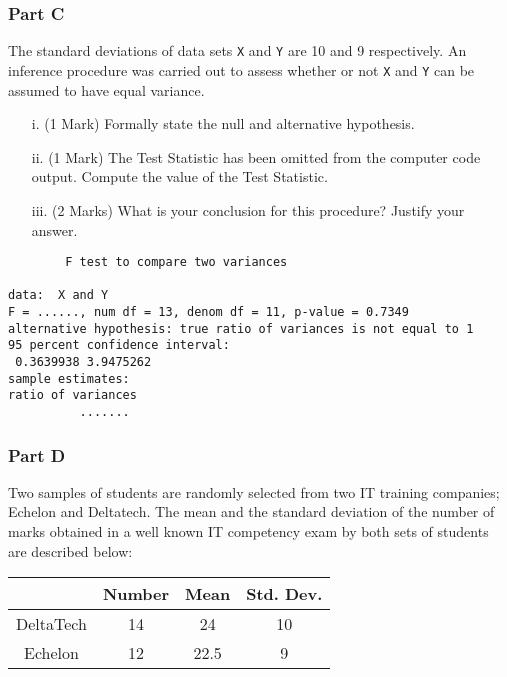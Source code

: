 \documentclass[a4paper,12pt]{article}
\begin{document}
\subsubsection*{Part C} %
The standard deviations of data sets \texttt{X} and \texttt{Y} are 10 and 9 respectively. An inference procedure was carried out to assess whether or not \texttt{X} and \texttt{Y} can be assumed to have equal variance.
\begin{itemize}
\item[i.](1 Mark) Formally state the null and alternative hypothesis.
\item[ii.](1 Mark) The Test Statistic has been omitted from the computer code output. Compute the value of the Test Statistic.
\item[iii.](2 Marks) What is your conclusion for this procedure? Justify your answer.
\end{itemize}

\begin{framed}
\begin{verbatim}
        F test to compare two variances

data:  X and Y
F = ......, num df = 13, denom df = 11, p-value = 0.7349
alternative hypothesis: true ratio of variances is not equal to 1
95 percent confidence interval:
 0.3639938 3.9475262
sample estimates:
ratio of variances
          .......
\end{verbatim}
\end{framed}

\subsubsection*{Part D} %
Two samples of students are randomly selected from two IT training companies; Echelon and Deltatech. The mean and the standard deviation of the number of marks obtained in a well known IT competency exam by both sets of students are described below:\\

\begin{center}
\begin{tabular}{|c|c|c|c|}

  \hline
	&Number&	Mean&	Std. Dev.\\ \hline
DeltaTech	&14	&24	&10\\
Echelon	&12	&22.5	&9\\
  \hline
\end{tabular}
\end{center}
\end{document}
